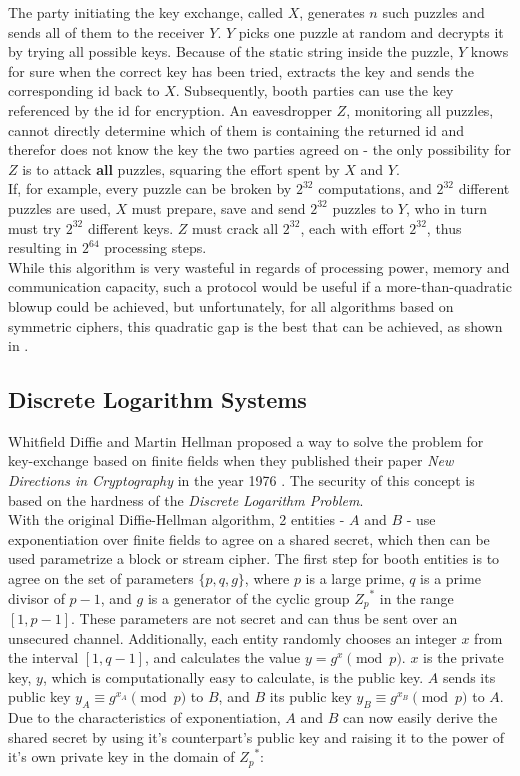 The party initiating the key exchange, called $X$, generates $n$ such puzzles and sends all of them to the receiver $Y$. $Y$ picks one puzzle at random and
decrypts it by trying all possible keys. Because of the static string inside the puzzle, $Y$ knows for sure when the correct key has been tried,
extracts the key and sends the corresponding id back to $X$. Subsequently, booth parties can use the key referenced by the id for encryption.
An eavesdropper $Z$, monitoring all puzzles, cannot directly determine which of them is containing the returned id and therefor does not know the key the 
two parties agreed on - the only possibility for $Z$ is to attack \textbf{all} puzzles, squaring the effort spent by $X$ and $Y$.
\\

If, for example, every puzzle can be broken by $2^{32}$ computations, and $2^{32}$ different puzzles are used, $X$ must prepare, save and send $2^{32}$ puzzles
to $Y$, who in turn must try $2^{32}$ different keys. $Z$ must crack all $2^{32}$, each with effort $2^{32}$, thus resulting in $2^{64}$ processing steps.
\\

While this algorithm is very wasteful in regards of processing power, memory and communication capacity, such a protocol would be useful if a more-than-quadratic
blowup could be achieved, but unfortunately, for all algorithms based on symmetric ciphers, this quadratic gap is the best that can be achieved,
as shown in \cite{Barak09merklepuzzles}. 

\subsection{Discrete Logarithm Systems}

Whitfield Diffie and Martin Hellman proposed a way to solve the problem for key-exchange based on finite fields
when they published their paper \textit{New Directions in Cryptography} in the year 1976 \cite{1055638}. The security of this concept
is based on the hardness of the \textit{Discrete Logarithm Problem}. 
\\

With the original Diffie-Hellman algorithm, 2 entities - $A$ and $B$ - use exponentiation over finite fields to agree on a shared secret, which
then can be used parametrize a block or stream cipher. The first step for booth entities is to agree on the set of parameters $\{p, q, g\}$, where $p$ is a 
large prime, $q$ is a prime divisor of $p-1$, and $g$ is a generator of the cyclic group ${Z_p}^*$ in the range $[1, p-1]$. These parameters are not secret and
can thus be sent over an unsecured channel.
Additionally, each entity randomly chooses an integer $x$ from the interval $[1, q-1]$, and calculates the value  $y = g^x \pmod p$. $x$ is the private key,
$y$, which is computationally easy to calculate, is the public key. $A$ sends its public key $y_A \equiv g^{x_A} \pmod p$ to $B$, and $B$ its public key
$y_B \equiv g^{x_B} \pmod p$ to $A$. Due to the characteristics of exponentiation, $A$ and $B$ can now easily derive the shared secret by using it's counterpart's
public key and raising it to the power of it's own private key in the domain of ${Z_p}^*$:

